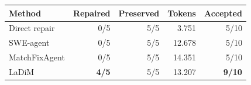 \begin{tabular*}{\linewidth}{@{\extracolsep{\fill}}lrrrr@{}}
\toprule
\textbf{Method} & \textbf{Repaired} & \textbf{Preserved} & \textbf{Tokens} & \textbf{Accepted} \\
\midrule
Direct repair & 0/5 & 5/5 & 3.751 & 5/10 \\
SWE-agent & 0/5 & 5/5 & 12.678 & 5/10 \\
MatchFixAgent & 0/5 & 5/5 & 14.351 & 5/10 \\
LaDiM & \textbf{4/5} & 5/5 & 13.207 & \textbf{9/10} \\
\bottomrule
\end{tabular*}
